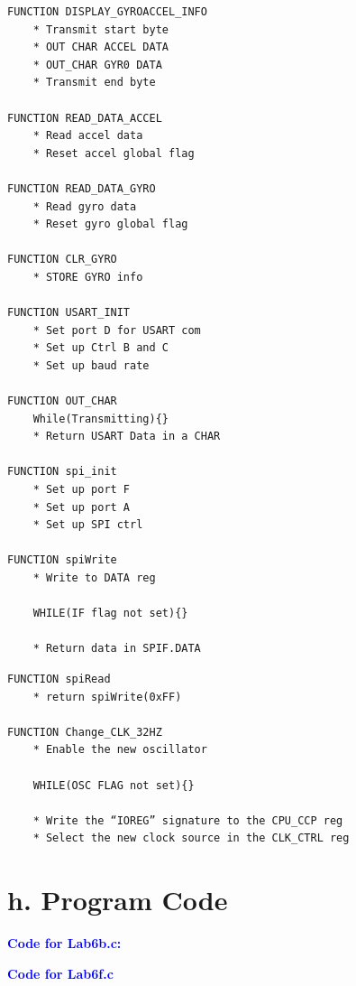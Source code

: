 \documentclass[11pt]{article}
\theoremstyle{plain}
\theoremstyle{definition}
\begin{document}
\begin{tcolorbox}
\begin{verbatim}
FUNCTION DISPLAY_GYROACCEL_INFO
    * Transmit start byte 
    * OUT CHAR ACCEL DATA
    * OUT_CHAR GYR0 DATA
    * Transmit end byte
    
FUNCTION READ_DATA_ACCEL
    * Read accel data
    * Reset accel global flag

FUNCTION READ_DATA_GYRO
    * Read gyro data
    * Reset gyro global flag    

FUNCTION CLR_GYRO
    * STORE GYRO info
    
FUNCTION USART_INIT
    * Set port D for USART com
    * Set up Ctrl B and C
    * Set up baud rate    

FUNCTION OUT_CHAR
    While(Transmitting){}
    * Return USART Data in a CHAR

FUNCTION spi_init 
    * Set up port F
    * Set up port A
    * Set up SPI ctrl

FUNCTION spiWrite
    * Write to DATA reg

    WHILE(IF flag not set){}

    * Return data in SPIF.DATA
\end{verbatim}
\end{tcolorbox}




\begin{tcolorbox}
\begin{verbatim}
FUNCTION spiRead
    * return spiWrite(0xFF)

FUNCTION Change_CLK_32HZ
    * Enable the new oscillator

    WHILE(OSC FLAG not set){}

    * Write the “IOREG” signature to the CPU_CCP reg
    * Select the new clock source in the CLK_CTRL reg

\end{verbatim}
\end{tcolorbox}


    












\newpage
%
%
%
%
\section*{h. Program Code}
\textbf{\textcolor{blue}{Code for Lab6b.c:}}

\newpage
\textbf{\textcolor{blue}{Code for Lab6f.c}}

\newpage
%
%
%
%
\end{document}
